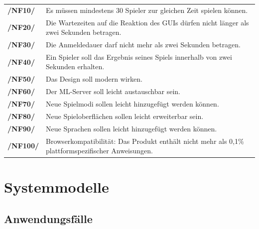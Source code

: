 \documentclass[a4paper]{scrreprt}
\begin{document}
    \begin{tabularx}{\linewidth}{@{}>{\bfseries}l@{\hspace{.5em}}X@{}}
        /NF10/ & Es müssen mindestens 30 Spieler zur gleichen Zeit spielen können.\\
        /NF20/ & Die Wartezeiten auf die Reaktion des GUIs dürfen nicht länger als zwei Sekunden betragen. \\
	/NF30/ & Die Anmeldedauer darf nicht mehr als zwei Sekunden betragen. \\
        /NF40/ & Ein Spieler soll das Ergebnis seines Spiels innerhalb von zwei Sekunden erhalten. \\
        /NF50/ & Das Design soll modern wirken. \\
        /NF60/ & Der \Gls{ML-Server} soll leicht austauschbar sein. \\
        /NF70/ & Neue Spielmodi sollen leicht hinzugefügt werden können. \\
        /NF80/ & Neue Spieloberflächen sollen leicht erweiterbar sein. \\
        /NF90/ & Neue Sprachen sollen leicht hinzugefügt werden können. \\
        /NF100/ & Browserkompatibilität: Das Produkt enthält nicht mehr als 0,1\% plattformspezifischer Anweisungen. \\
    \end{tabularx}

    \chapter{Systemmodelle}
    \section{Anwendungsfälle}
\end{document}
